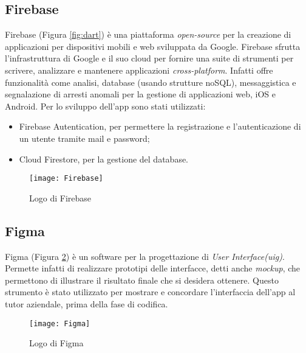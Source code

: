 \subsection{Firebase}
Firebase (Figura \ref{fig:dart}) è una piattaforma \emph{open-source} per la creazione di applicazioni per dispositivi mobili e web sviluppata da Google.\newline
Firebase sfrutta l'infrastruttura di Google e il suo cloud per fornire una suite di strumenti per scrivere, analizzare e mantenere applicazioni \emph{cross-platform}.\newline
Infatti offre funzionalità come analisi, database (usando strutture noSQL), messaggistica e segnalazione di arresti anomali per la gestione di applicazioni web, iOS e Android.\newline
Per lo sviluppo dell'app sono stati utilizzati:
\begin{itemize}
    \item Firebase Autentication, per permettere la registrazione e l'autenticazione di un utente tramite mail e password;
    \item Cloud Firestore, per la gestione del database.
\end{itemize}
\begin{figure}[!h] 
    \centering 
    \texttt{[image: Firebase]} 
    \caption{Logo di Firebase}\label{fig:figma}
\end{figure}

\subsection{Figma}
Figma (Figura \ref{fig:figma}) è un software per la progettazione di \emph{User Interface(\gls{uig})}.\newline
Permette infatti di realizzare prototipi delle interfacce, detti anche \emph{mockup}, che permettono di illustrare il risultato finale che si desidera ottenere.\newline
Questo strumento è stato utilizzato per mostrare e concordare l'interfaccia dell'app al tutor aziendale, prima della fase di codifica.\newline
\begin{figure}[!h] 
    \centering 
    \texttt{[image: Figma]} 
    \caption{Logo di Figma}\label{fig:figma}
\end{figure}

